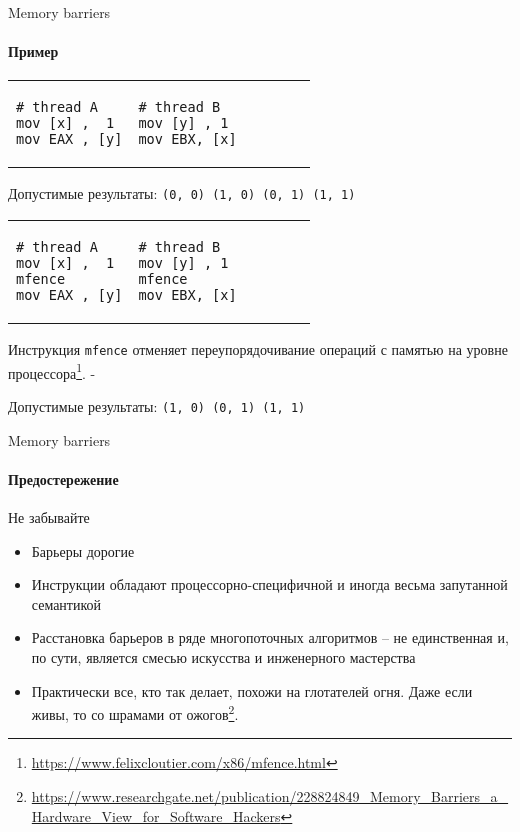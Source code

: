 \begin{frame}[fragile]{Memory barriers}
\framesubtitle{Пример}

\vspace{-0.5cm}

\begin{tabular}{p{} p{}}
\begin{verbatim}
# thread A
mov [x] ,  1
mov EAX , [y]
\end{verbatim}

& 

\begin{verbatim}
# thread B          
mov [y] , 1
mov EBX, [x]
\end{verbatim}
\end{tabular}

Допустимые результаты: 
\pause 
\texttt{(0, 0) (1, 0) (0, 1) (1, 1)}

\pause
\vspace{-0.25cm}

\begin{tabular}{p{} p{}}
\begin{verbatim}
# thread A
mov [x] ,  1
mfence      
mov EAX , [y]
\end{verbatim}

& 

\begin{verbatim}
# thread B          
mov [y] , 1
mfence
mov EBX, [x]
\end{verbatim}
\end{tabular}

\pause
Инструкция \texttt{mfence} отменяет переупорядочивание операций с памятью на уровне процессора\footnote<4->{\tiny\url{https://www.felixcloutier.com/x86/mfence.html}}.
-
\pause

Допустимые результаты: \pause \texttt{(1, 0) (0, 1) (1, 1)}
\end{frame}


\begin{frame}{Memory barriers}
\framesubtitle{Предостережение}

Не забывайте
\begin{itemize}
  \pause
  \item Барьеры дорогие

  \pause
  \item Инструкции обладают процессорно-специфичной и иногда весьма запутанной семантикой

  \pause
  \item Расстановка барьеров в ряде многопоточных алгоритмов -- не единственная и, по сути, является смесью искусства и инженерного мастерства

  \pause
  \item Практически все, кто так делает, похожи на глотателей огня. Даже если живы, то со шрамами от ожогов\footnote<5->{\tiny\url{https://www.researchgate.net/publication/228824849_Memory_Barriers_a_Hardware_View_for_Software_Hackers}}.
\end{itemize}
\end{frame}


